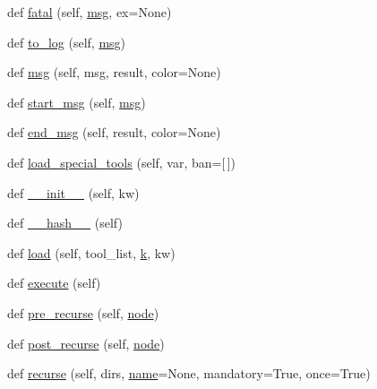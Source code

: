 \begin{DoxyCompactItemize}
def \hyperlink{classwaflib_1_1_context_1_1_context_a42739307965d7ef470985d7bb7408788}{fatal} (self, \hyperlink{classwaflib_1_1_context_1_1_context_a7495a2e04e528aa54bda3cadf08240cb}{msg}, ex=None)
\item 
def \hyperlink{classwaflib_1_1_context_1_1_context_a596fa2d8dc5a61602101f43ec1eb3e7e}{to\+\_\+log} (self, \hyperlink{classwaflib_1_1_context_1_1_context_a7495a2e04e528aa54bda3cadf08240cb}{msg})
\item 
def \hyperlink{classwaflib_1_1_context_1_1_context_a7495a2e04e528aa54bda3cadf08240cb}{msg} (self, msg, result, color=None)
\item 
def \hyperlink{classwaflib_1_1_context_1_1_context_a344a0dff2c7b0d2d76057d55b83c3f16}{start\+\_\+msg} (self, \hyperlink{classwaflib_1_1_context_1_1_context_a7495a2e04e528aa54bda3cadf08240cb}{msg})
\item 
def \hyperlink{classwaflib_1_1_context_1_1_context_a6340799a7fa4dc1230d13b7c08eec789}{end\+\_\+msg} (self, result, color=None)
\item 
def \hyperlink{classwaflib_1_1_context_1_1_context_a95a53e6c363450df77f847bec6c56696}{load\+\_\+special\+\_\+tools} (self, var, ban=\mbox{[}$\,$\mbox{]})
\item 
def \hyperlink{classwaflib_1_1_context_1_1_context_ab8fabf802b21a8a8e77c3e3811c58c84}{\+\_\+\+\_\+init\+\_\+\+\_\+} (self, kw)
\item 
def \hyperlink{classwaflib_1_1_context_1_1_context_ae8096e428213ed965d8cd5629c2481a1}{\+\_\+\+\_\+hash\+\_\+\+\_\+} (self)
\item 
def \hyperlink{classwaflib_1_1_context_1_1_context_ad214db6a7b3ce05051972f7d073a74f2}{load} (self, tool\+\_\+list, \hyperlink{rfft2d_test_m_l_8m_adc468c70fb574ebd07287b38d0d0676d}{k}, kw)
\item 
def \hyperlink{classwaflib_1_1_context_1_1_context_ae98aa77cb954743799c5b730c6775329}{execute} (self)
\item 
def \hyperlink{classwaflib_1_1_context_1_1_context_a290c81ad18ad9b3c0bcbde2d8fce519e}{pre\+\_\+recurse} (self, \hyperlink{structnode}{node})
\item 
def \hyperlink{classwaflib_1_1_context_1_1_context_ab818cd610ecc0c6fa981f0cde9f3dd13}{post\+\_\+recurse} (self, \hyperlink{structnode}{node})
\item 
def \hyperlink{classwaflib_1_1_context_1_1_context_a10e3b0d5e63bb03a0a7adbb32c3dceab}{recurse} (self, dirs, \hyperlink{lib_2expat_8h_a1b49b495b59f9e73205b69ad1a2965b0}{name}=None, mandatory=True, once=True)
\item 

\end{DoxyCompactItemize}
